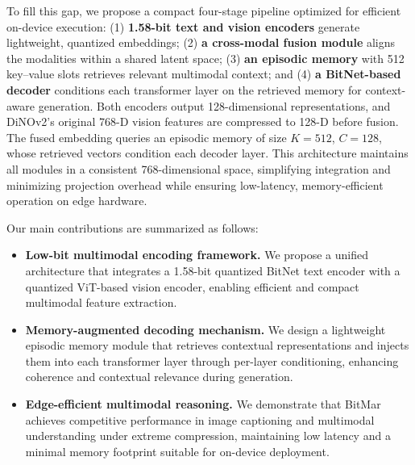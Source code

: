 To fill this gap, we propose a compact four-stage pipeline optimized for efficient on-device execution: 
(1) \textbf{1.58-bit text and vision encoders} generate lightweight, quantized embeddings; 
(2) \textbf{a cross-modal fusion module} aligns the modalities within a shared latent space; 
(3) \textbf{an episodic memory} with 512 key--value slots retrieves relevant multimodal context; and 
(4) \textbf{a BitNet-based decoder} conditions each transformer layer on the retrieved memory for context-aware generation. 
Both encoders output 128-dimensional representations, and DiNOv2’s original 768-D vision features are compressed to 128-D before fusion. 
The fused embedding queries an episodic memory of size $K = 512$, $C = 128$, whose retrieved vectors condition each decoder layer. 
This architecture maintains all modules in a consistent 768-dimensional space, simplifying integration and minimizing projection overhead while ensuring low-latency, memory-efficient operation on edge hardware.



Our main contributions are summarized as follows:
\begin{itemize}
    \item \textbf{Low-bit multimodal encoding framework.} 
    We propose a unified architecture that integrates a 1.58-bit quantized BitNet text encoder with a quantized ViT-based vision encoder, enabling efficient and compact multimodal feature extraction.
    
    \item \textbf{Memory-augmented decoding mechanism.} 
    We design a lightweight episodic memory module that retrieves contextual representations and injects them into each transformer layer through per-layer conditioning, enhancing coherence and contextual relevance during generation.
    
    \item \textbf{Edge-efficient multimodal reasoning.} 
    We demonstrate that BitMar achieves competitive performance in image captioning and multimodal understanding under extreme compression, maintaining low latency and a minimal memory footprint suitable for on-device deployment.
\end{itemize}
